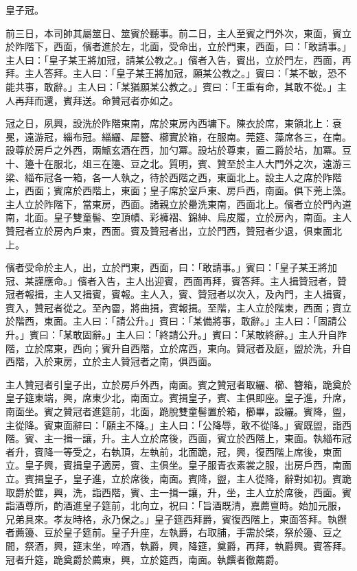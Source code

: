 \begin{pinyinscope}
 皇子冠。



 前三日，本司帥其屬筮日、筮賓於聽事。前二日，主人至賓之門外次，東面，賓立於阼階下，西面，儐者進於左，北面，受命出，立於門東，西面，曰：「敢請事。」主人曰：「皇子某王將加冠，請某公教之。」儐者入告，賓出，立於門左，西面，再拜。主人答拜。主人曰：「皇子某王將加冠，願某公教之。」賓曰：「某不敏，恐不能共事，敢辭。」主人曰：「某猶願某公教之。」賓曰：「王重有命，其敢不從。」主人再拜而還，賓拜送。命贊冠者亦如之。



 冠之日，夙興，設洗於阼階東南，席於東房內西墉下。陳衣於席，東領北上：袞冕，遠游冠，緇布冠。緇纚、犀簪、櫛實於箱，在服南。莞筵、藻席各三，在南。設尊於房戶之外西，兩甒玄酒在西，加勺冪。設坫於尊東，置二爵於坫，加冪。豆十、籩十在服北，俎三在籩、豆之北。質明，賓、贊至於主人大門外之次，遠游三梁、緇布冠各一箱，各一人執之，待於西階之西，東面北上。設主人之席於阼階上，西面；賓席於西階上，東面；皇子席於室戶東、房戶西，南面。俱下莞上藻。主人立於阼階下，當東房，西面。諸親立於罍洗東南，西面北上。儐者立於門內道南，北面。皇子雙童髻、空頂幘、彩褲褶、錦紳、烏皮履，立於房內，南面。主人贊冠者立於房內戶東，西面。賓及贊冠者出，立於門西，贊冠者少退，俱東面北上。



 儐者受命於主人，出，立於門東，西面，曰：「敢請事。」賓曰：「皇子某王將加冠、某謹應命。」儐者入告，主人出迎賓，西面再拜，賓答拜。主人揖贊冠者，贊冠者報揖，主人又揖賓，賓報。主人入，賓、贊冠者以次入，及內門，主人揖賓，賓入，贊冠者從之。至內霤，將曲揖，賓報揖。至階，主人立於階東，西面；賓立於階西，東面。主人曰：「請公升。」賓曰：「某備將事，敢辭。」主人曰：「固請公升。」賓曰：「某敢固辭。」主人曰：「終請公升。」賓曰：「某敢終辭。」主人升自阼階，立於席東，西向；賓升自西階，立於席西，東向。贊冠者及庭，盥於洗，升自西階，入於東房，立於主人贊冠者之南，俱西面。



 主人贊冠者引皇子出，立於房戶外西，南面。賓之贊冠者取纚、櫛、簪箱，跪奠於皇子筵東端，興，席東少北，南面立。賓揖皇子，賓、主俱即座。皇子進，升席，南面坐。賓之贊冠者進筵前，北面，跪脫雙童髻置於箱，櫛畢，設纚。賓降，盥，主從降。賓東面辭曰：「願主不降。」主人曰：「公降辱，敢不從降。」賓既盥，詣西階。賓、主一揖一讓，升。主人立於席後，西面，賓立於西階上，東面。執緇布冠者升，賓降一等受之，右執頂，左執前，北面跪，冠，興，復西階上席後，東面立。皇子興，賓揖皇子適房，賓、主俱坐。皇子服青衣素裳之服，出房戶西，南面立。賓揖皇子，皇子進，立於席後，南面。賓降，盥，主人從降，辭對如初。賓跪取爵於篚，興，洗，詣西階，賓、主一揖一讓，升，坐，主人立於席後，西面。賓詣酒尊所，酌酒進皇子筵前，北向立，祝曰：「旨酒既清，嘉薦亶時。始加元服，兄弟具來。孝友時格，永乃保之。」皇子筵西拜爵，賓復西階上，東面答拜。執饌者薦籩、豆於皇子筵前。皇子升座，左執爵，右取脯，手需於棨，祭於籩、豆之間，祭酒，興，筵末坐，啐酒，執爵，興，降筵，奠爵，再拜，執爵興。賓答拜。冠者升筵，跪奠爵於薦東，興，立於筵西，南面。執饌者徹薦爵。




\end{pinyinscope}
